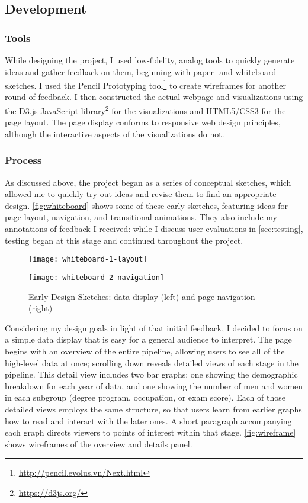 \subsection{Development}\label{sec:development}
\subsubsection{Tools}
While designing the project, I used low-fidelity, analog tools to quickly generate ideas and gather feedback on them, beginning with paper- and whiteboard sketches. I used the Pencil Prototyping tool\footnote{\url{http://pencil.evolus.vn/Next.html}} to create wireframes for another round of feedback. I then constructed the actual webpage and visualizations using the D3.js JavaScript library\footnote{\url{https://d3js.org/}} for the visualizations and HTML5/CSS3 for the page layout. The page display conforms to responsive web design principles, although the interactive aspects of the visualizations do not.

\subsubsection{Process}
As discussed above, the project began as a series of conceptual sketches, which allowed me to quickly try out ideas and revise them to find an appropriate design. \autoref{fig:whiteboard} shows some of these early sketches, featuring ideas for page layout, navigation, and transitional animations. They also include my annotations of feedback I received: while I discuss user evaluations in \autoref{sec:testing}, testing began at this stage and continued throughout the project.

\begin{figure}
  \begin{minipage}{0.5\textwidth}
    \texttt{[image: whiteboard-1-layout]}
  \end{minipage}
  \begin{minipage}{0.5\textwidth}
    \texttt{[image: whiteboard-2-navigation]}
  \end{minipage}
  \caption{Early Design Sketches: data display (left) and page navigation (right)}\label{fig:whiteboard}
\end{figure}

Considering my design goals in light of that initial feedback, I decided to focus on a simple data display that is easy for a general audience to interpret. The page begins with an overview of the entire pipeline, allowing users to see all of the high-level data at once; scrolling down reveals detailed views of each stage in the pipeline. This detail view includes two bar graphs: one showing the demographic breakdown for each year of data, and one showing the number of men and women in each subgroup (degree program, occupation, or exam score). Each of those detailed views employs the same structure, so that users learn from earlier graphs how to read and interact with the later ones. A short paragraph accompanying each graph directs viewers to points of interest within that stage. \autoref{fig:wireframe} shows wireframes of the overview and details panel.

